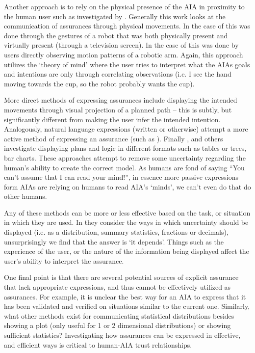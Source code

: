     Another approach is to rely on the physical presence of the AIA in proximity to the human user such as investigated by \cite{Bainbridge2011-pl, Dragan2013-wd}. Generally this work looks at the communication of assurances through physical movements. In the case of \cite{Bainbridge2011-pl} this was done through the gestures of a robot that was both physically present and virtually present (through a television screen). In the case of \cite{Dragan2013-wd} this was done by users directly observing motion patterns of a robotic arm. Again, this approach utilizes the `theory of mind' where the user tries to interpret what the AIAs goals and intentions are only through correlating observations (i.e. I see the hand moving towards the cup, so the robot probably wants the cup).

    More direct methods of expressing assurances include displaying the intended movements through visual projection of a planned path \cite{Chadalavada2015-wx} -- this is subtly, but significantly different from making the user infer the intended intention. Analogously, natural language expressions (written or otherwise) attempt a more active method of expressing an assurance (such as \cite{Wang2016-id}). Finally 
    \cite{Van_Belle2013-ph, Huysmans2011-th, Hutchins2015-if}, and others investigate displaying plans and logic in different formats such as tables or trees, bar charts. These approaches attempt to remove some uncertainty regarding the human's ability to create the correct model. As humans are fond of saying ``You can't assume that I can read your mind!'', in essence more passive expressions form AIAs are relying on humans to read AIA's `minds', we can't even do that do other humans.

    Any of these methods can be more or less effective based on the task, or situation in which they are used. In \cite{Chen2014-dk,Wallace2001-fm,Kuhn1997-qc,Lacave2002-cu} they consider the ways in which uncertainty should be displayed (i.e. as a distribution, summary statistics, fractions or decimals), unsurprisingly we find that the answer is `it depends'. Things such as the experience of the user, or the nature of the information being displayed affect the user's ability to interpret the assurance.

    One final point is that there are several potential sources of explicit assurance that lack appropriate expressions, and thus cannot be effectively utilized as assurances. For example, it is unclear the best way for an AIA to express that it has been validated and verified on situations similar to the current one. Similarly, what other methods exist for communicating statistical distributions besides showing a plot (only useful for 1 or 2 dimensional distributions) or showing sufficient statistics? Investigating how assurances can be expressed in effective, and efficient ways is critical to human-AIA trust relationships.

